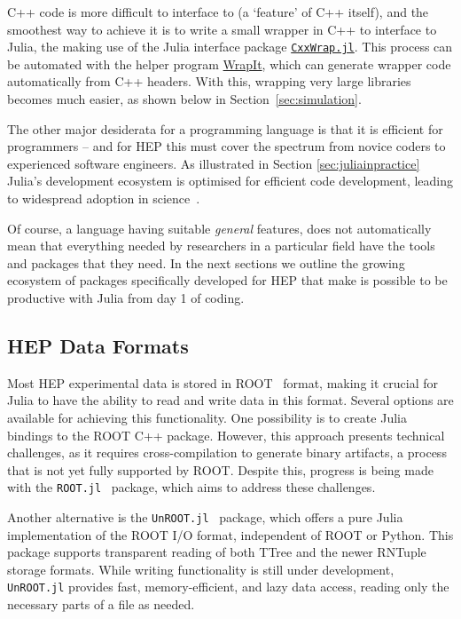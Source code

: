 \documentclass{webofc}
\begin{document}

C++ code is more difficult to interface to (a `feature' of C++ itself), and the
smoothest way to achieve it is to write a small wrapper in C++ to interface to
Julia, the making use of the Julia interface package
\href{https://github.com/JuliaInterop/CxxWrap.jl}{\texttt{CxxWrap.jl}}. This
process can be automated with the helper program
\href{https://github.com/grasph/wrapit}{WrapIt}, which can generate wrapper code
automatically from C++ headers. With this, wrapping very large libraries becomes
much easier, as shown below in Section~\ref{sec:simulation}.

The other major desiderata for a programming language is that it is efficient
for programmers -- and for HEP this must cover the spectrum from novice coders
to experienced software engineers. As illustrated in Section
\ref{sec:juliainpractice} Julia's development ecosystem is optimised for
efficient code development, leading to widespread adoption in
science~\cite{perkel-julia-science}.

Of course, a language having suitable \emph{general} features, does not
automatically mean that everything needed by researchers in a particular field
have the tools and packages that they need. In the next sections we outline the
growing ecosystem of packages specifically developed for HEP that make is
possible to be productive with Julia from day 1 of coding. 

\subsection{HEP Data Formats}
\label{sec:hepdataformats}

Most HEP experimental data is stored in ROOT~\cite{ROOT:2011zz} format, making
it crucial for Julia to have the ability to read and write data in this format.
Several options are available for achieving this functionality. One possibility
is to create Julia bindings to the ROOT C++ package. However, this approach
presents technical challenges, as it requires cross-compilation to generate
binary artifacts, a process that is not yet fully supported by ROOT. Despite
this, progress is being made with the \texttt{ROOT.jl}~\cite{ROOT_jl} package,
which aims to address these challenges.

Another alternative is the \texttt{UnROOT.jl}~\cite{UnROOT:2022vnn} package,
which offers a pure Julia implementation of the ROOT I/O format, independent of
ROOT or Python. This package supports transparent reading of both TTree and the
newer RNTuple storage formats. While writing functionality is still under
development, \texttt{UnROOT.jl} provides fast, memory-efficient, and lazy data
access, reading only the necessary parts of a file as needed.
\end{document}
